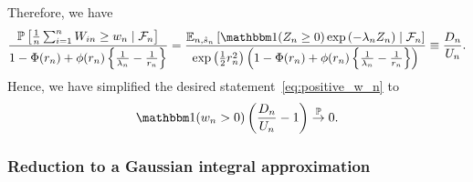 \documentclass[12pt]{article}
\theoremstyle{definition}
\def\P{\mathbb{P}}
\def\P{\mathbb{P}}
\newcommand{\E}{\mathbb E}								%
\renewcommand{\P}{\mathbb{P}}							%
\newcommand{\indicator}{\mathbbm 1}						%
\newcommand{\convp}{\overset{\mathbb{P}}{\rightarrow}}             %
\begin{document}
Therefore, we have
\begin{equation}\label{eq:Dn_Un_Def}
\frac{\P\left[\frac1n \sum_{i = 1}^n W_{in} \geq w_n \mid \mathcal F_n\right]}{1-\Phi(r_n)+\phi(r_n)\left\{\frac{1}{\lambda_n}-\frac{1}{r_n}\right\}} = \frac{\E_{n, \hat s_n}\left[\indicator(Z_n \geq 0)\exp\left(-\lambda_n Z_n \right) \mid \mathcal F_n\right]}{\exp\left(\frac12 r_n^2\right)\left(1-\Phi(r_n)+\phi(r_n)\left\{\frac{1}{\lambda_n}-\frac{1}{r_n}\right\}\right)} \equiv \frac{D_n}{U_n}.
\end{equation}
Hence, we have simplified the desired statement~\eqref{eq:positive_w_n} to 
\begin{equation}
\indicator(w_n > 0) \left(\frac{D_n}{U_n} - 1\right) \convp 0.
\label{eq:simplified_desired_statement}
\end{equation}

\subsubsection{Reduction to a Gaussian integral approximation}
\end{document}
